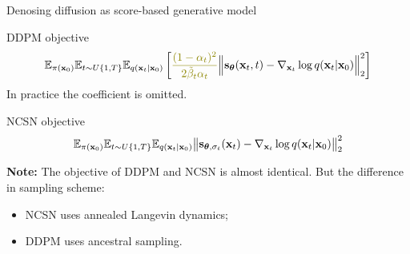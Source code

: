 \begin{frame}{Denosing diffusion as score-based generative model}
	\begin{block}{DDPM objective}
		\vspace{-0.5cm}
		\[
			\bbE_{\pi(\bx_0)} \bbE_{t \sim U\{1, T\}}\bbE_{q(\bx_t | \bx_0)} \left[ {\color{olive}\frac{(1 - \alpha_t)^2}{2\tilde{\beta}_t \alpha_t}} \Bigl\|  \bs_{\btheta} (\bx_t, t) - \nabla_{\bx_t} \log q(\bx_t | \bx_0) \Bigr\|_2^2  \right]
		\]
		In practice {\color{olive}the coefficient} is omitted.
	\end{block}
	\begin{block}{NCSN objective}
		\vspace{-0.3cm}
		\[
			\mathbb{E}_{\pi(\mathbf{x}_0)} \mathbb{E}_{t \sim U\{1, T\}} \mathbb{E}_{q(\mathbf{x}_t | \mathbf{x}_0)}\bigl\| \mathbf{s}_{\boldsymbol{\theta}, \sigma_t}(\mathbf{x}_t) - \nabla_{\mathbf{x}_t} \log q(\mathbf{x}_t | \mathbf{x}_0) \bigr\|^2_2 
		\]
		\vspace{-0.3cm}
	\end{block}
	\textbf{Note:} The objective of DDPM and NCSN is almost identical. But the difference in sampling scheme:
	\begin{itemize}
		\item NCSN uses annealed Langevin dynamics;
		\item DDPM uses ancestral sampling.
	\end{itemize}
	\end{frame}
